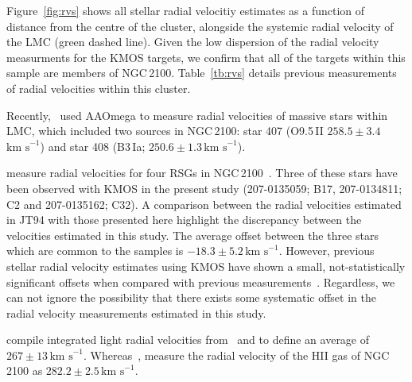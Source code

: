 \documentclass[useAMS,usenatbib]{mn2e}
\def\kms{$\mbox{km s}^{-1}$}
\begin{document}
Figure~\ref{fig:rvs} shows all stellar radial velocitiy estimates as a function of distance from the centre of the cluster, alongside the systemic radial velocity of the LMC (green dashed line).
Given the low dispersion of the radial velocity measurments for the KMOS targets, we confirm that all of the targets within this sample are members of NGC\,2100.
Table~\ref{tb:rvs} details previous measurements of radial velocities within this cluster.

Recently,~\cite{2015arXiv150803490E} used AAOmega to measure radial velocities of massive stars within LMC, which included two sources in NGC\,2100: star 407 (O9.5\,II $258.5\pm3.4$\,\kms) and star 408 (B3\,Ia; $250.6\pm1.3$\,\kms).

\cite{1994A&A...282..717J} measure radial velocities for four RSGs in NGC\,2100~\citep[B17, C2, C32 and C34 using the nomenclature of][]{1974A&AS...15..261R}.
Three of these stars have been observed with KMOS in the present study (207-0135059; B17, 207-0134811; C2 and 207-0135162; C32).
A comparison between the radial velocities estimated in JT94 with those presented here highlight the discrepancy between the velocities estimated in this study.
The average offset between the three stars which are common to the samples is $-18.3\pm5.2$\,\kms.
However, previous stellar radial velocity estimates using KMOS have shown a small, not-statistically significant offsets when compared with previous measurements~\citep{2015ApJ...798...23L,2015ApJ...803...14P}.
Regardless, we can not ignore the possibility that there exists some systematic offset in the radial velocity measurements estimated in this study.


\cite{1983ApJ...272..488F} compile integrated light radial velocities from~\cite{1972MNRAS.159..445A} and \cite{1970PhD...........F} to define an average of $267\pm13\,$\kms.
Whereas~\cite{1971ApJ...169..271S}, measure the radial velocity of the HII gas of NGC\,2100 as $282.2\pm2.5\,$\kms.
\end{document}
